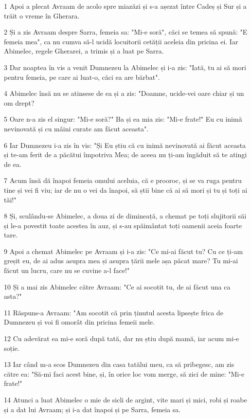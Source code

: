 \par 1 Apoi a plecat Avraam de acolo spre miazăzi și s-a așezat între Cadeș și Sur și a trăit o vreme în Gherara.
\par 2 Și a zis Avraam despre Sarra, femeia sa: "Mi-e soră", căci se temea să spună: "E femeia mea", ca nu cumva să-l ucidă locuitorii cetății aceleia din pricina ei. Iar Abimelec, regele Gherarei, a trimis și a luat pe Sarra.
\par 3 Dar noaptea în vis a venit Dumnezeu la Abimelec și i-a zis: "Iată, tu ai să mori pentru femeia, pe care ai luat-o, căci ea are bărbat".
\par 4 Abimelec însă nu se atinsese de ea și a zis: "Doamne, ucide-vei oare chiar și un om drept?
\par 5 Oare n-a zis el singur: "Mi-e soră?" Ba și ea mia zis: "Mi-e frate!" Eu cu inimă nevinovată și cu mâini curate am făcut aceasta".
\par 6 Iar Dumnezeu i-a zis în vis: "Și Eu știu că cu inimă nevinovată ai făcut aceasta și te-am ferit de a păcătui împotriva Mea; de aceea nu ți-am îngăduit să te atingi de ea.
\par 7 Acum însă dă înapoi femeia omului aceluia, că e prooroc, și se va ruga pentru tine și vei fi viu; iar de nu o vei da înapoi, să știi bine că ai să mori și tu și toți ai tăi!"
\par 8 Și, sculându-se Abimelec, a doua zi de dimineață, a chemat pe toți slujitorii săi și le-a povestit toate acestea în auz, și s-au spăimântat toți oamenii aceia foarte tare.
\par 9 Apoi a chemat Abimelec pe Avraam și i-a zis: "Ce mi-ai făcut tu? Cu ce ți-am greșit eu, de ai adus asupra mea și asupra țării mele așa păcat mare? Tu mi-ai făcut un lucru, care nu se cuvine a-l face!"
\par 10 Și a mai zis Abimelec către Avraam: "Ce ai socotit tu, de ai făcut una ca asta?"
\par 11 Răspuns-a Avraam: "Am socotit că prin ținutul acesta lipsește frica de Dumnezeu și voi fi omorât din pricina femeii mele.
\par 12 Cu adevărat ea mi-e soră după tată, dar nu știu după mamă, iar acum mi-e soție.
\par 13 Iar când m-a scos Dumnezeu din casa tatălui meu, ca să pribegesc, am zis către ea: "Să-mi faci acest bine, și, în orice loc vom merge, să zici de mine: "Mi-e frate!"
\par 14 Atunci a luat Abimelec o mie de sicli de argint, vite mari și mici, robi și roabe și a dat lui Avraam; și i-a dat înapoi și pe Sarra, femeia sa.
